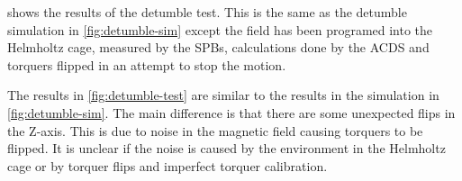  shows the results of the detumble test. This is the same as the detumble simulation in \cref{fig:detumble-sim} except the field has been programed into the Helmholtz cage, measured by the \acp{SPB}, calculations done by the \ac{ACDS} and torquers flipped in an attempt to stop the motion.

The results in \cref{fig:detumble-test} are similar to the results in the simulation in \cref{fig:detumble-sim}. The main difference is that there are some unexpected flips in the Z-axis. This is due to noise in the magnetic field causing torquers to be flipped. It is unclear if the noise is caused by the environment in the Helmholtz cage or by torquer flips and imperfect torquer calibration.


